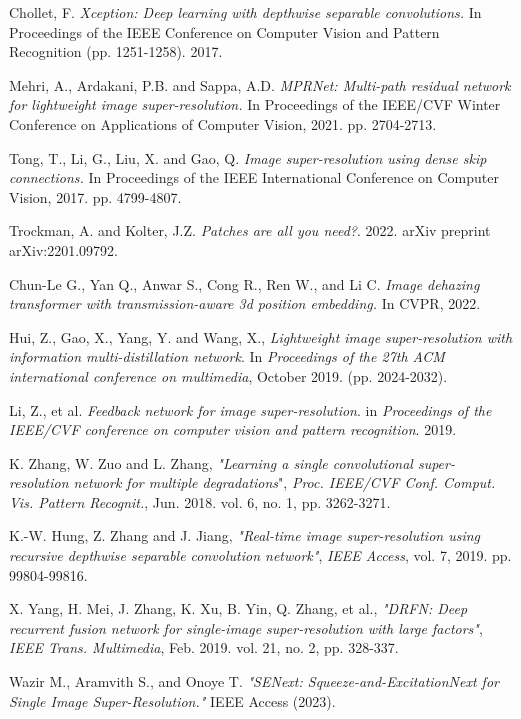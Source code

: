 \documentclass[twocolumn]{svjour3}          %
\begin{document}
\begin{thebibliography}{00}
 Chollet, F. \textit{Xception: Deep learning with depthwise separable convolutions.} In Proceedings of the IEEE Conference on Computer Vision and Pattern Recognition (pp. 1251-1258). 2017.

 Mehri, A., Ardakani, P.B. and Sappa, A.D. \textit{MPRNet: Multi-path residual network for lightweight image super-resolution.} In Proceedings of the IEEE/CVF Winter Conference on Applications of Computer Vision, 2021. pp. 2704-2713.

 Tong, T., Li, G., Liu, X. and Gao, Q. \textit{Image super-resolution using dense skip connections.} In Proceedings of the IEEE International Conference on Computer Vision, 2017. pp. 4799-4807. 

 Trockman, A. and Kolter, J.Z. \textit{Patches are all you need?}.  2022. arXiv preprint arXiv:2201.09792.

 Chun-Le G., Yan Q., Anwar S., Cong R., Ren W., and Li C. \textit{Image dehazing transformer with transmission-aware 3d position embedding.} In CVPR, 2022.

 Hui, Z., Gao, X., Yang, Y. and Wang, X., \textit{Lightweight image super-resolution with information multi-distillation network}. In \textit{Proceedings of the 27th ACM international conference on multimedia}, October 2019. (pp. 2024-2032).

 Li, Z., et al. \textit{Feedback network for image super-resolution}. in \textit{Proceedings of the IEEE/CVF conference on computer vision and pattern recognition}. 2019.

 K. Zhang, W. Zuo and L. Zhang, \textit{"Learning a single convolutional super-resolution network for multiple degradations}", \textit{Proc. IEEE/CVF Conf. Comput. Vis. Pattern Recognit.}, Jun. 2018. vol. 6, no. 1, pp. 3262-3271.

 K.-W. Hung, Z. Zhang and J. Jiang, \textit{"Real-time image super-resolution using recursive depthwise separable convolution network"}, \textit{IEEE Access}, vol. 7, 2019. pp. 99804-99816.

 X. Yang, H. Mei, J. Zhang, K. Xu, B. Yin, Q. Zhang, et al., \textit{"DRFN: Deep recurrent fusion network for single-image super-resolution with large factors"}, \textit{IEEE Trans. Multimedia}, Feb. 2019. vol. 21, no. 2, pp. 328-337.

 Wazir M., Aramvith S., and Onoye T. \textit{"SENext: Squeeze-and-ExcitationNext for Single Image Super-Resolution." }IEEE Access (2023).



\end{thebibliography}
\end{document}
